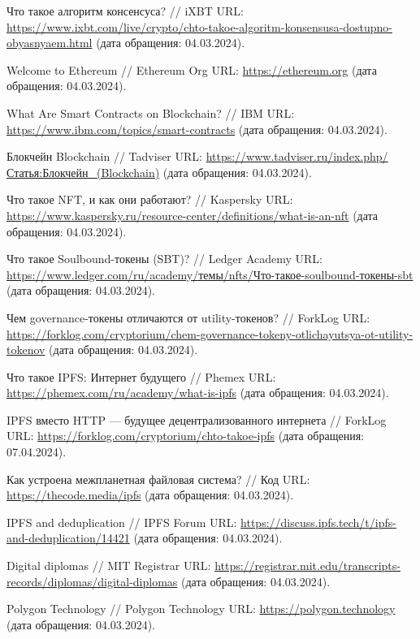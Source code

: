 \begin{thebibliography}{99\kern\bibindent}
	 Что такое алгоритм консенсуса? // iXBT URL: \url{https://www.ixbt.com/live/crypto/chto-takoe-algoritm-konsensusa-dostupno-obyasnyaem.html} (дата обращения: 04.03.2024).

	 Welcome to Ethereum // Ethereum Org URL: \url{https://ethereum.org} (дата обращения: 04.03.2024).

	 What Are Smart Contracts on Blockchain? // IBM URL: \url{https://www.ibm.com/topics/smart-contracts} (дата обращения: 04.03.2024).

	 Блокчейн
	Blockchain // Tadviser URL: \url{https://www.tadviser.ru/index.php/Статья:Блокчейн_(Blockchain)} (дата обращения: 04.03.2024).

	 Что такое NFT, и как они работают? // Kaspersky URL: \url{https://www.kaspersky.ru/resource-center/definitions/what-is-an-nft} (дата обращения: 04.03.2024).

	 Что такое Soulbound-токены (SBT)? // Ledger Academy URL: \url{https://www.ledger.com/ru/academy/темы/nfts/Что-такое-soulbound-токены-sbt} (дата обращения: 04.03.2024).

	 Чем governance-токены отличаются от utility-токенов? // ForkLog URL: \url{https://forklog.com/cryptorium/chem-governance-tokeny-otlichayutsya-ot-utility-tokenov} (дата обращения: 04.03.2024).

	 Что такое IPFS: Интернет будущего // Phemex URL: \url{https://phemex.com/ru/academy/what-is-ipfs} (дата обращения: 04.03.2024).

	 IPFS вместо HTTP — будущее децентрализованного интернета // ForkLog URL: \url{https://forklog.com/cryptorium/chto-takoe-ipfs} (дата обращения: 07.04.2024).

	 Как устроена межпланетная файловая система? // Код URL: \url{https://thecode.media/ipfs} (дата обращения: 04.03.2024).

	 IPFS and deduplication // IPFS Forum URL: \url{https://discuss.ipfs.tech/t/ipfs-and-deduplication/14421} (дата обращения: 04.03.2024).

	 Digital diplomas // MIT Registrar URL: \url{https://registrar.mit.edu/transcripts-records/diplomas/digital-diplomas} (дата обращения: 04.03.2024).

	 Polygon Technology // Polygon Technology URL: \url{https://polygon.technology} (дата обращения: 04.03.2024).
	

\end{thebibliography}
